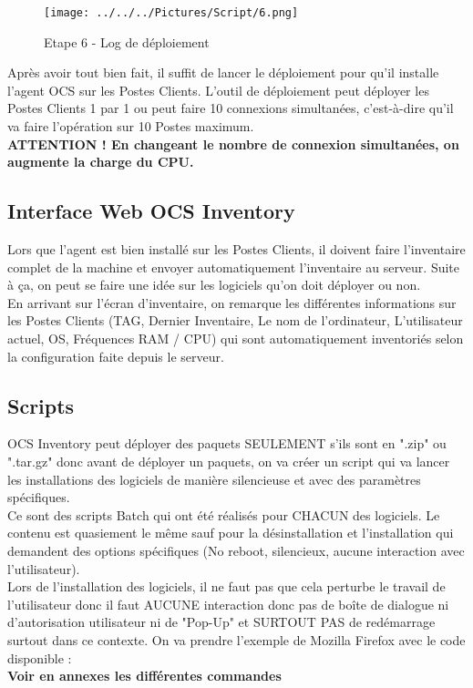 \documentclass[11pt,a4paper,oneside]{article}
\begin{document}
\begin{figure}[hbtp]
\centering
\texttt{[image: ../../../Pictures/Script/6.png]}
\caption{Etape 6 - Log de déploiement}
\end{figure}

Après avoir tout bien fait, il suffit de lancer le déploiement pour qu'il installe l'agent OCS sur les Postes Clients. L'outil de déploiement peut déployer les Postes Clients 1 par 1 ou peut faire 10 connexions simultanées, c'est-à-dire qu'il va faire l'opération sur 10 Postes maximum. \\ 
\textbf{ATTENTION ! En changeant le nombre de connexion simultanées, on augmente la charge du CPU.}
\newpage
\subsection{Interface Web OCS Inventory}
Lors que l'agent est bien installé sur les Postes Clients, il doivent faire l'inventaire complet de la machine et envoyer automatiquement l'inventaire au serveur. Suite à ça, on peut se faire une idée sur les logiciels qu'on doit déployer ou non. \\

En arrivant sur l'écran d'inventaire, on remarque les différentes informations sur les Postes Clients (TAG, Dernier Inventaire, Le nom de l'ordinateur, L'utilisateur actuel, OS, Fréquences RAM / CPU) qui sont automatiquement inventoriés selon la configuration faite depuis le serveur.
\subsection{Scripts}

OCS Inventory peut déployer des paquets SEULEMENT s'ils sont en ".zip" ou ".tar.gz" donc avant de déployer un paquets, on va créer un script qui va lancer les installations des logiciels de manière silencieuse et avec des paramètres spécifiques.
\\	
Ce sont des scripts Batch qui ont été réalisés pour CHACUN des logiciels. Le contenu est quasiement le même sauf pour la désinstallation et l'installation qui demandent des options spécifiques (No reboot, silencieux, aucune interaction avec l'utilisateur).
\\
Lors de l'installation des logiciels, il ne faut pas que cela perturbe le travail de l'utilisateur donc il faut AUCUNE interaction donc pas de boîte de dialogue ni d'autorisation utilisateur ni de "Pop-Up" et SURTOUT PAS de redémarrage surtout dans ce contexte.
\newpage
On va prendre l'exemple de Mozilla Firefox avec le code disponible :
\\
\textbf{Voir en annexes les différentes commandes}
  
\end{document}
